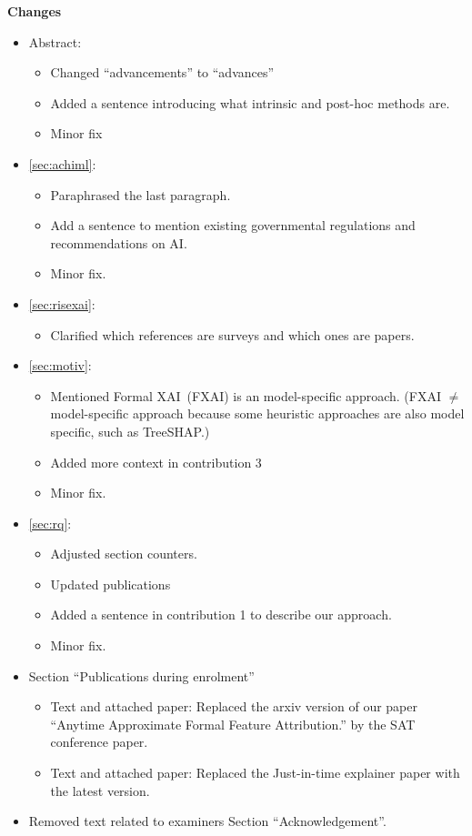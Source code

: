 \color{blue}
\textbf{Changes}

\begin{itemize}
	\item Abstract:
		\begin{itemize}
			\item Changed ``advancements'' to ``advances''
			\item Added a sentence introducing what intrinsic and post-hoc methods are.
			\item Minor fix
		\end{itemize}
	\item \autoref{sec:achiml}:
		\begin{itemize}
			\item Paraphrased the last paragraph.
			\item Add a sentence to mention existing governmental regulations and
				recommendations on AI.
				\item Minor fix.
		\end{itemize}
	\item \autoref{sec:risexai}:
		\begin{itemize}
			\item Clarified which references are surveys and which ones are papers.
		\end{itemize}
	\item \autoref{sec:motiv}:
		\begin{itemize}
			\item Mentioned Formal XAI~(FXAI) is an model-specific approach. (FXAI
				$\neq$ model-specific approach because some heuristic approaches are
				also model specific, such as TreeSHAP.)
			\item Added more context in contribution 3
			\item Minor fix.
		\end{itemize}
	\item \autoref{sec:rq}:
		\begin{itemize}
			\item Adjusted section counters.
			\item Updated publications
			\item Added a sentence in contribution 1 to describe our approach.
			\item Minor fix.
		\end{itemize}
	\item Section ``Publications during enrolment''
		\begin{itemize}
			\item Text and attached paper: Replaced the arxiv version of our paper ``Anytime Approximate Formal
				Feature Attribution.'' by the SAT conference paper.
			\item Text and attached paper: Replaced the Just-in-time explainer paper
				with the latest version. 
		\end{itemize}
	\item Removed text related to examiners Section ``Acknowledgement''.
	
\end{itemize}
\color{black}

